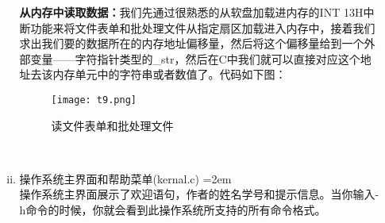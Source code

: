 \documentclass[UTF8]{article}
\begin{document}
\begin{enumerate}[1)]
\begin{enumerate}[i)]
		{{\bfseries 从内存中读取数据：}我们先通过很熟悉的从软盘加载进内存的INT 13H中断功能来将文件表单和批处理文件从指定扇区加载进入内存中，接着我们求出我们要的数据所在的内存地址偏移量，然后将这个偏移量给到一个外部变量——字符指针类型的\_str，然后在C中我们就可以直接对应这个地址去该内存单元中的字符串或者数值了。代码如下图：}
		\begin{figure}[htbp]
			\centering
			\texttt{[image: t9.png]}
			\caption{读文件表单和批处理文件}
		\end{figure}
		\\
		\item 操作系统主界面和帮助菜单(kernal.c)
		\parindent=2em
{\\操作系统主界面展示了欢迎语句，作者的姓名学号和提示信息。当你输入-h命令的时候，你就会看到此操作系统所支持的所有命令格式。}
	

\end{enumerate}
\end{enumerate}
\end{document}
